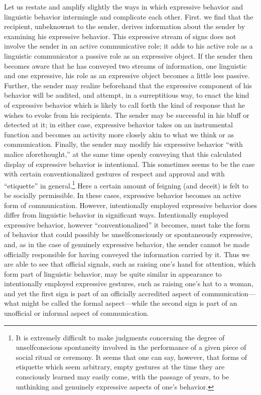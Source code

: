\documentclass[twoside,symmetric,nobib,justified]{tufte-book}
\begin{document}
Let us restate and amplify slightly the ways in which ex­pressive
behavior and linguistic behavior intermingle and com­plicate each other.
First. we find that the recipient, unbe­knownst to the sender, derives
information about the sender by examining his expressive behavior. This
expressive stream of signs does not involve the sender in an active
communicative role; it adds to his active role as a linguistic
communicator a passive role as an expressive object. If the sender then
becomes aware that he has conveyed two streams of information, one
linguistic and one expressive, his role as an expressive object becomes
a little less passive. Further, the sender may realize beforehand that
the expressive component of his behavior will be audited, and attempt,
in a surreptitious way, to enact the kind of expressive behavior which
is likely to call forth the kind of response that he wishes to evoke
from his recipients. The sender may be successful in his bluff or
detected at it; in either case, ex­pressive behavior takes on an
instrumental function and becomes an activity more closely akin to what
we think or as communication. Finally, the sender may modify his
expressive behavior ``with malice aforethought,'' at the same time
openly conveying that this calculated display of expressive behavior is
intentional. This sometimes seems to be the case with certain
conventionalized gestures of respect and approval and with ``etiquette''
in general.\footnote{It is extremely difficult to make judgments
  concerning the degree of unselfconscious spontaneity involved in the
  per­formance of a given piece of social ritual or ceremony. It seems
  that one can say, however, that forms of etiquette which seem
  arbitrary, empty gestures at the time they are consciously learned may
  easily come, with the passage of years, to be unthinking and genuinely
  expressive aspects of one's behavior.} Here a certain amount of
feigning (and deceit) is felt to be socially permissible. In these
cases, expressive behavior becomes an active form of communication.
However, in­tentionally employed expressive behavior does differ from
lin­guistic behavior in significant ways. Intentionally employed
expressive behavior, however ``conventionalized'' it becomes, must take
the form of behavior that could possibly be unselfconsciously or
spontaneously expressive, and, as in the case of genuinely expressive
behavior, the sender cannot be made officially re­sponsible for having
conveyed the information carried by it. Thus we are able to see that
official signals, such as raising one's hand for attention, which form
part of linguistic behavior, may be quite similar in appearance to
intentionally employed ex­pressive gestures, such as raising one's hat to
a woman, and yet the first sign is part of an officially accredited
aspect of communication---what might be called the formal aspect---while
the second sign is part of an unofficial or informal aspect of
communication.
\end{document}
